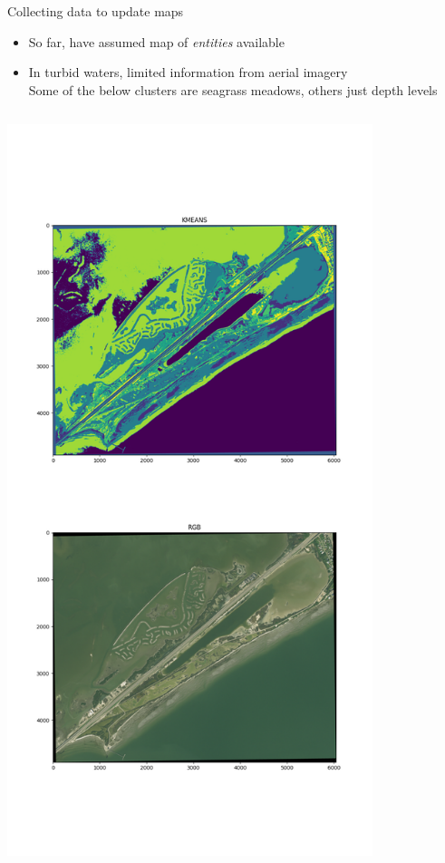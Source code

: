\documentclass[9pt,xcolor=table]{beamer}
\begin{document}
\begin{frame}{Collecting data to update maps}
    \begin{itemize}
        \item So far, have assumed map of \textit{entities} available
        \item In turbid waters, limited information from aerial imagery \\
        Some of the below clusters are seagrass meadows, others just depth levels
    \end{itemize}
    \begin{columns}
        \begin{column}{0.5\textwidth}
        \includegraphics[width=0.8\textwidth,trim={4cm 9cm 4cm 33cm},clip]{img/clusters.png}  

\end{column}
\end{columns}
\end{frame}
\end{document}
